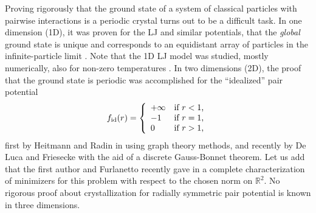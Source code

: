 \documentclass[12pt]{iopart}
\theoremstyle{definition}
\newcommand{\R}{\mathbb R}
\begin{document}
Proving rigorously that the ground state of a system of classical
particles with pairwise interactions is a periodic crystal turns out to be
a difficult task.
In one dimension (1D), it was proven for the LJ and similar
potentials, that the {\em global} ground state is unique and corresponds to
an equidistant array of particles in the infinite-particle limit
\cite{Gardner79,Hamrick79,Katz84,Stillinger95,Ventevogel78}.
Note that the 1D LJ model was studied, mostly numerically,
also for non-zero temperatures \cite{Lee17,Lepri05}.
In two dimensions (2D), the proof that the ground state is periodic
was accomplished for the ``idealized'' pair potential
\begin{equation}
f_{\rm id}(r) = \left\{
\begin{array}{ll}
+\infty & \mbox{if $r<1$,} \cr
-1 & \mbox{if $r=1$,} \cr
0 & \mbox{if $r>1$,}
\end{array}  
\right.  
\end{equation}
first by Heitmann and Radin in \cite{Rad2} using graph theory methods,
and recently by De Luca and Friesecke \cite{Luca17} with the aid of
a discrete Gauss-Bonnet theorem.
Let us add that the first author and Furlanetto recently gave in
\cite{BetFur24} a complete characterization of minimizers for
this problem with respect to the chosen norm on $\R^2$.
No rigorous proof about crystallization for radially symmetric pair
potential is known in three dimensions.
\end{document}
